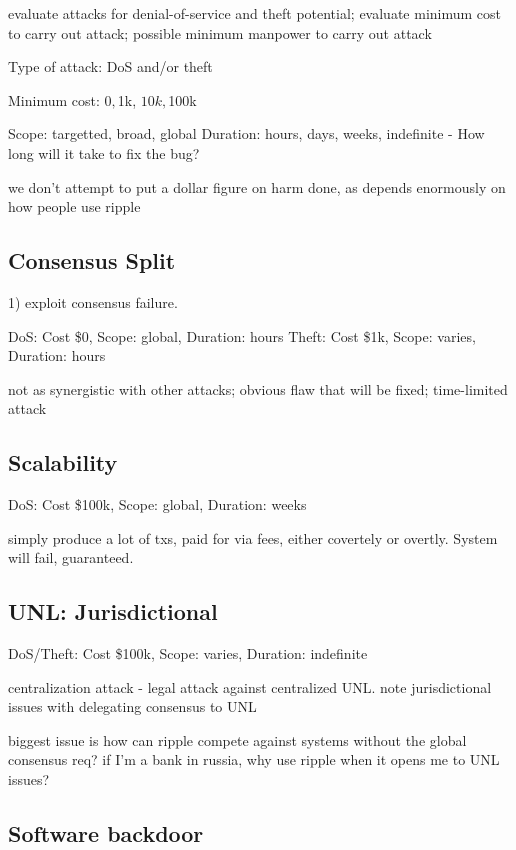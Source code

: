 \documentclass{article}
\begin{document}
evaluate attacks for denial-of-service and theft potential; evaluate minimum
cost to carry out attack; possible minimum manpower to carry out attack


Type of attack: DoS and/or theft

Minimum cost: $0, $1k, $10k, $100k

Scope: targetted, broad, global
Duration: hours, days, weeks, indefinite - How long will it take to fix the bug?

we don't attempt to put a dollar figure on harm done, as depends enormously on
how people use ripple


\subsection{Consensus Split}

1) exploit consensus failure.

DoS: Cost \$0, Scope: global, Duration: hours
Theft: Cost \$1k, Scope: varies, Duration: hours

not as synergistic with other attacks; obvious flaw that will be fixed;
time-limited attack


\subsection{Scalability}

DoS: Cost \$100k, Scope: global, Duration: weeks

simply produce a lot of txs, paid for via fees, either covertely or overtly.
System will fail, guaranteed.


\subsection{UNL: Jurisdictional}

DoS/Theft: Cost \$100k, Scope: varies, Duration: indefinite

centralization attack - legal attack against centralized UNL. note
jurisdictional issues with delegating consensus to UNL

biggest issue is how can ripple compete against systems without the global
consensus req? if I'm a bank in russia, why use ripple when it opens me to UNL
issues?


\subsection{Software backdoor}
\end{document}
